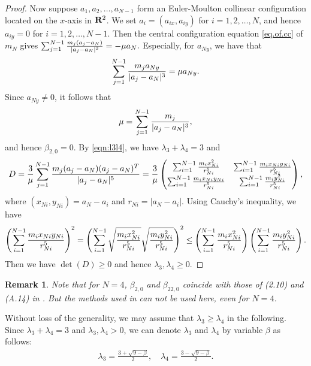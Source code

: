 \documentclass[11pt]{article}
\newtheorem{remark}[lemma]{Remark}
\def\lb{\label}
\def\R{{\bf R}}
\def\bb{{\beta}}
\def\cA{{\cal A}}
\begin{document}
\begin{proof}
Now suppose $a_1,a_2,\ldots,a_{N-1}$ form an Euler-Moulton collinear configuration located on the $x$-axis in $\R^2$. 
We set $a_i=(a_{ix},a_{iy})$ for $i=1,2,\ldots,N$,
and hence $a_{iy}=0$ for $i=1,2,\ldots,N-1$.
Then the central configuration equation \eqref{eq.of.cc} of $m_N$ gives
$
\sum_{j=1}^{N-1}{m_j(a_j-a_N)\over|a_j-a_N|^3}=-\mu a_N.
$
Especially, for $a_{Ny}$, we have that 
\begin{equation}
\sum_{j=1}^{N-1}{m_ja_{Ny}\over|a_j-a_N|^3}=\mu a_{Ny}.
\end{equation}
Since $a_{Ny}\ne0$, it follows that 
\begin{equation}\label{second.formula.of.mu}
\mu=\sum_{j=1}^{N-1}{m_j\over|a_j-a_N|^3},
\end{equation}
and hence $\beta_{2,0}=0$. By \eqref{eqn:l3l4}, we have
$\lambda_3+\lambda_4=3$
and
\begin{align}
D={3\over\mu}\sum_{j=1}^{N-1}{m_j(a_j-a_N)(a_j-a_N)^T\over|a_j-a_N|^5}
={3\over\mu}
\begin{pmatrix}
       \sum_{i=1}^{N-1}{m_ix_{Ni}^2\over r_{Ni}^5} &
	\sum_{i=1}^{N-1}{m_ix_{Ni}y_{Ni}\over r_{Ni}^5}\\
	\sum_{i=1}^{N-1}{m_ix_{Ni}y_{Ni}\over r_{Ni}^5} &
	\sum_{i=1}^{N-1}{m_iy_{Ni}^2\over r_{Ni}^5} 
\end{pmatrix},\lb{eqn:D}
\end{align}
where $(x_{Ni},y_{Ni})=a_N-a_i$ and $r_{Ni}=|a_N-a_i|$.
Using Cauchy's inequality, we have
\begin{equation}
\left(\sum_{i=1}^{N-1}{m_ix_{Ni}y_{Ni}\over r_{Ni}^5}\right)^2
=\left(\sum_{i=1}^{N-1}\sqrt{m_ix_{Ni}^2\over r_{Ni}^5}\sqrt{m_iy_{Ni}^2\over r_{Ni}^5}\right)^2
\le\left(\sum_{i=1}^{N-1}{m_ix_{Ni}^2\over r_{Ni}^5}\right)
   \left(\sum_{i=1}^{N-1}{m_iy_{Ni}^2\over r_{Ni}^5}\right).
\end{equation}
Then we have $\det(D)\ge0$ and hence $\lambda_3,\lambda_4 \geq 0$. 
\end{proof}

\begin{remark}
Note that for $N=4$,  $\beta_{2,0}$ and $\beta_{22,0}$ coincide with
those of (2.10) and (A.14) in \cite{LiZ}.
But the methods used in \cite{LiZ} can not be used
here, even for $N=4$.
\end{remark}

Without loss of the generality, we may assume that $\lambda_3 \geq \lambda_4$ in the following.
Since $\lambda_3 + \lambda_4 = 3$ and $\lambda_3, \lambda_4 > 0$, we can denote $\lambda_3$ and $\lambda_4$ by variable $\beta$ as follows: 
\begin{align}
  \lambda_3 = \frac{3 + \sqrt{9 -\beta}}{2}, \quad \lambda_4 = \frac{3 - \sqrt{9 -\beta}}{2}.
\end{align}
\end{document}
